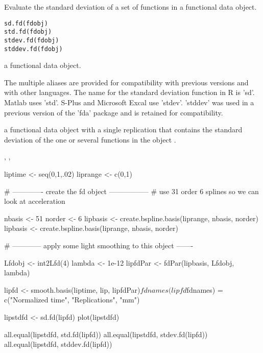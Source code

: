 \begin{Description}\relax
Evaluate the standard deviation of a set of functions in a functional
data object.
\end{Description}
\begin{Usage}
\begin{verbatim}
sd.fd(fdobj)
std.fd(fdobj)
stdev.fd(fdobj)
stddev.fd(fdobj)
\end{verbatim}
\end{Usage}
\begin{Arguments}
\begin{ldescription}
\item[\code{fdobj}] a functional data object.

\end{ldescription}
\end{Arguments}
\begin{Details}\relax
The multiple aliases are provided for compatibility with previous
versions and with other languages.  The name for the standard
deviation function in R is 'sd'.  Matlab uses 'std'.  S-Plus and
Microsoft Excal use 'stdev'.  'stddev' was used in a previous version
of the 'fda' package and is retained for compatibility.
\end{Details}
\begin{Value}
a functional data object with a single replication
that contains the standard deviation of the one or several functions in
the object .
\end{Value}
\begin{SeeAlso}\relax
{}, 
, 
\end{SeeAlso}
\begin{Examples}
\begin{ExampleCode}
liptime  <- seq(0,1,.02)
liprange <- c(0,1)

#  -------------  create the fd object -----------------
#       use 31 order 6 splines so we can look at acceleration

nbasis <- 51
norder <- 6
lipbasis <- create.bspline.basis(liprange, nbasis, norder)
lipbasis <- create.bspline.basis(liprange, nbasis, norder)

#  ------------  apply some light smoothing to this object  -------

Lfdobj   <- int2Lfd(4)
lambda   <- 1e-12
lipfdPar <- fdPar(lipbasis, Lfdobj, lambda)

lipfd <- smooth.basis(liptime, lip, lipfdPar)$fd
names(lipfd$fdnames) = c("Normalized time", "Replications", "mm")

lipstdfd <- sd.fd(lipfd)
plot(lipstdfd)

all.equal(lipstdfd, std.fd(lipfd))
all.equal(lipstdfd, stdev.fd(lipfd))
all.equal(lipstdfd, stddev.fd(lipfd))

\end{ExampleCode}
\end{Examples}

